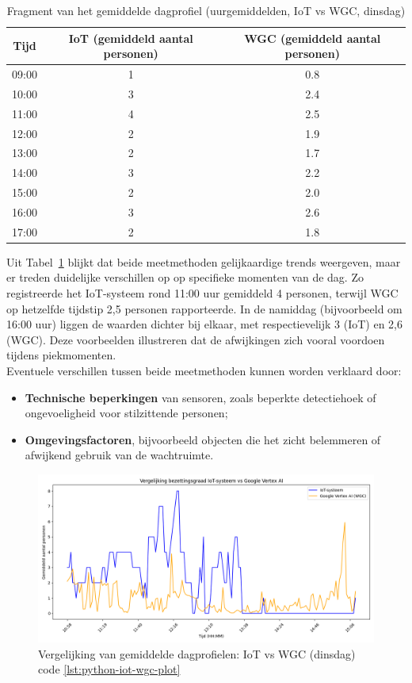 \begin{table}[H]
    \centering
    \caption{Fragment van het gemiddelde dagprofiel (uurgemiddelden, IoT vs WGC, dinsdag)}
    \label{tab:dagprofiel}
    \begin{tabular}{|c|c|c|}
        \hline
        \textbf{Tijd} & \textbf{IoT (gemiddeld aantal personen)} & \textbf{WGC (gemiddeld aantal personen)} \\
        \hline
        09:00 & 1 & 0.8 \\
        10:00 & 3 & 2.4 \\
        11:00 & 4 & 2.5 \\
        12:00 & 2 & 1.9 \\
        13:00 & 2 & 1.7 \\
        14:00 & 3 & 2.2 \\
        15:00 & 2 & 2.0 \\
        16:00 & 3 & 2.6 \\
        17:00 & 2 & 1.8 \\
        \hline
    \end{tabular}
\end{table}

Uit Tabel~\ref{tab:dagprofiel} blijkt dat beide meetmethoden gelijkaardige trends weergeven, maar er treden duidelijke verschillen op op specifieke momenten van de dag. Zo registreerde het IoT-systeem rond 11:00 uur gemiddeld 4 personen, terwijl WGC op hetzelfde tijdstip 2,5 personen rapporteerde. In de namiddag (bijvoorbeeld om 16:00 uur) liggen de waarden dichter bij elkaar, met respectievelijk 3 (IoT) en 2,6 (WGC). Deze voorbeelden illustreren dat de afwijkingen zich vooral voordoen tijdens piekmomenten. \\


Eventuele verschillen tussen beide meetmethoden kunnen worden verklaard door:
\begin{itemize}
    \item \textbf{Technische beperkingen} van sensoren, zoals beperkte detectiehoek of ongevoeligheid voor stilzittende personen;
    \item \textbf{Omgevingsfactoren}, bijvoorbeeld objecten die het zicht belemmeren of afwijkend gebruik van de wachtruimte.
\end{itemize}

\begin{figure}[H]
    \centering
    \includegraphics[width=\textwidth]{img/bp/Figure_1.png}
    \caption{Vergelijking van gemiddelde dagprofielen: IoT vs WGC (dinsdag) code \ref{lst:python-iot-wgc-plot}}
    \label{fig:dagprofiel}
\end{figure}

